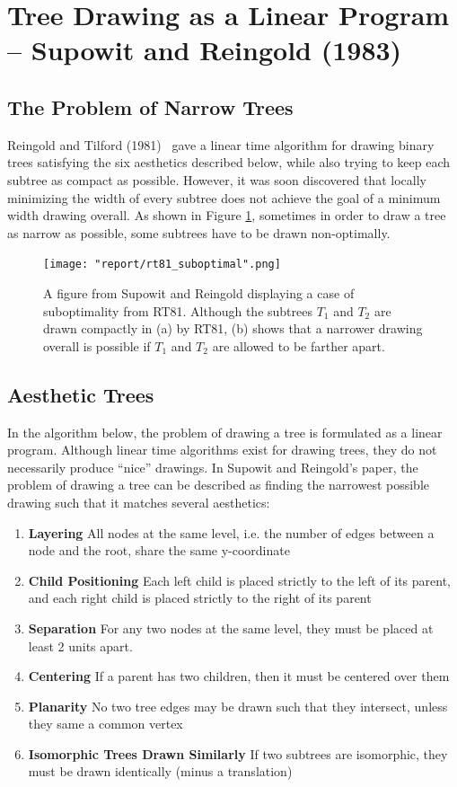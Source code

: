 \documentclass[11pt]{report}
\begin{document}
\section{Tree Drawing as a Linear Program -- Supowit and Reingold (1983)}
\subsection{The Problem of Narrow Trees}
Reingold and Tilford (1981)~\cite{reingold1981tidier} gave a linear time algorithm for drawing binary trees satisfying the six aesthetics described below, while also trying to keep each subtree as compact as possible. However, it was soon discovered that locally minimizing the width of every subtree does not achieve the goal of a minimum width drawing overall. As shown in Figure \ref{fig:rt81_suboptimal}, sometimes in order to draw a tree as narrow as possible, some subtrees have to be drawn non-optimally.

\begin{figure}[H]
    \centering
    \texttt{[image: "report/rt81\_suboptimal".png]}
    \caption{A figure from Supowit and Reingold displaying a case of suboptimality from RT81. Although the subtrees $T_1$ and $T_2$ are drawn compactly in (a) by RT81, (b) shows that a narrower drawing overall is possible if $T_1$ and $T_2$ are allowed to be farther apart. }
    \label{fig:rt81_suboptimal}
\end{figure}

\subsection{Aesthetic Trees}

In the algorithm below, the problem of drawing a tree is formulated as a linear program.\cite{supowit1983complexity} Although linear time algorithms exist for drawing trees, they do not necessarily produce ``nice'' drawings. In Supowit and Reingold's paper, the problem of drawing a tree can be described as finding the narrowest possible drawing such that it matches several aesthetics:
\begin{enumerate}
    \item \textbf{Layering} All nodes at the same level, i.e. the number of edges between a node and the root, share the same y-coordinate
    \item \textbf{Child Positioning} Each left child is placed strictly to the left of its parent, and each right child is placed strictly to the right of its parent
    \item \textbf{Separation} For any two nodes at the same level, they must be placed at least 2 units apart.
    \item \textbf{Centering} If a parent has two children, then it must be centered over them
    \item \textbf{Planarity} No two tree edges may be drawn such that they intersect, unless they same a common vertex
    \item \textbf{Isomorphic Trees Drawn Similarly} If two subtrees are isomorphic, they must be drawn identically (minus a translation)
\end{enumerate}
\end{document}

